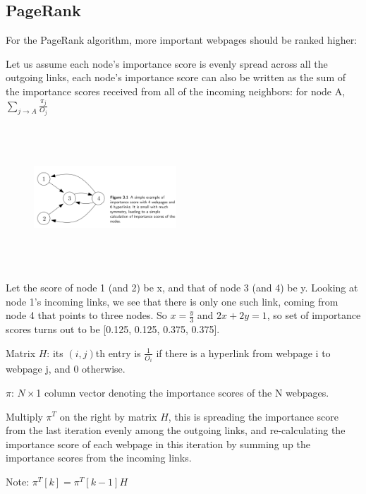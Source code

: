\subsection{PageRank}


For the PageRank algorithm, more important webpages should be ranked higher:


Let us assume each node’s importance score is evenly spread across all the outgoing links, each node’s importance score can also be written as the sum of the importance scores received from all of the incoming neighbors: for node A, $\sum_{j \rightarrow A}\frac{\pi_j}{O_j}$


\begin{figure}
	\centering
	\includegraphics[width=2.1in,height=2.1in]{figures/ch03/figure0.jpg}
\end{figure}


Let the score of node 1 (and 2) be x, and that of node 3 (and 4) be y. Looking at node 1's incoming links, we see that there is only one such link, coming from node 4 that points to three nodes. So $x = \frac{y}{3}$ and $2x + 2y = 1$, so set of importance scores turns out to be [0.125, 0.125, 0.375, 0.375].

Matrix $H$: its $(i,j)$th entry is $\frac{1}{O_i}$ if there is a hyperlink from webpage i to webpage j, and 0 otherwise.

$\pi$: $N \times$1 column vector denoting the importance scores of the N webpages.

Multiply $\pi^T$ on the right by matrix $H$, this is spreading the importance score from the last iteration evenly among the outgoing links, and re-calculating the importance score of each webpage in this iteration by summing up the importance scores from the incoming links.

Note: $\pi^T[k] = \pi^T[k - 1]H$



